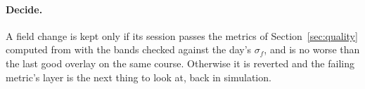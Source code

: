 \paragraph{Decide.} A field change is kept only if its session passes the metrics of
Section~\ref{sec:quality} computed from  with the bands checked against the day's
$\sigma_f$, and is no worse than the last good overlay on the same course. Otherwise it is reverted
and the failing metric's layer is the next thing to look at, back in simulation.
